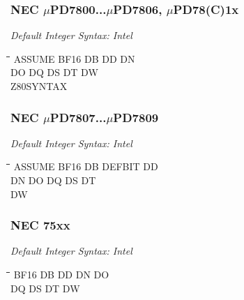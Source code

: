 \subsubsection{NEC $\mu$PD7800...$\mu$PD7806, $\mu$PD78(C)1x}

{\em Default Integer Syntax: Intel}

{\tt\begin{tabbing}
\hspace{3cm}\=\hspace{3cm}\=\hspace{3cm}\=\hspace{3cm}\=\kill
ASSUME     \> BF16        \> DB          \> DD          \> DN \\
DO         \> DQ          \> DS          \> DT          \> DW \\
Z80SYNTAX \\
\end{tabbing}}

\subsubsection{NEC $\mu$PD7807...$\mu$PD7809}

{\em Default Integer Syntax: Intel}

{\tt\begin{tabbing}
\hspace{3cm}\=\hspace{3cm}\=\hspace{3cm}\=\hspace{3cm}\=\kill
ASSUME     \> BF16        \> DB          \> DEFBIT     \> DD \\
DN         \> DO          \> DQ          \> DS         \> DT \\
DW \\
\end{tabbing}}

\subsubsection{NEC 75xx}

{\em Default Integer Syntax: Intel}

{\tt\begin{tabbing}
\hspace{3cm}\=\hspace{3cm}\=\hspace{3cm}\=\hspace{3cm}\=\kill
BF16       \> DB          \> DD          \> DN         \> DO \\
DQ         \> DS          \> DT          \> DW \\
\end{tabbing}}

